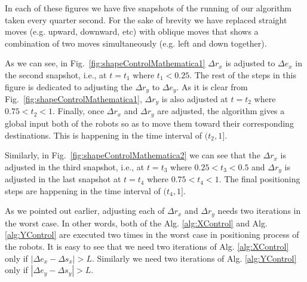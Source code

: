 In each of these figures we have five snapshots of the running of our algorithm taken every quarter second. For the sake of brevity we have replaced straight moves (e.g. upward, downward, etc) with oblique moves that shows a combination of two moves simultaneously (e.g. left and down together). 

As we can see, in Fig.~\ref{fig:shapeControlMathematica1} $\Delta r_x$ is adjusted to $\Delta e_x$ in the second snapshot, i.e., at $t = t_1$ where $t_1<0.25$. The rest of the steps in this figure is dedicated to adjusting the $\Delta r_y$ to $\Delta e_y$. As it is clear from Fig.~\ref{fig:shapeControlMathematica1}, $\Delta r_y$ is also adjusted at $t = t_2$ where $0.75<t_2<1$. Finally, once $\Delta r_x$ and $\Delta r_y$ are adjusted, the algorithm gives a global input both of the robots so as to move them toward their corresponding destinations. This is happening in the time interval of $(t_2,1]$.

Similarly, in Fig.~\ref{fig:shapeControlMathematica2} we can see that the $\Delta r_x$ is adjusted in the third snapshot, i.e., at $t=t_3$ where $0.25<t_3<0.5$ and $\Delta r_y$ is adjusted in the last snapshot at $t=t_4$ where $0.75<t_4<1$. The final positioning steps are happening in the time interval of $(t_4,1]$.

As we pointed out earlier, adjusting each of $\Delta r_x$ and $\Delta r_y$ needs two iterations in the worst case. In other words, both of the Alg. \ref{alg:XControl} and Alg. \ref{alg:YControl} are executed two times in the worst case in positioning process of the robots. It is easy to see that we need two iterations of Alg. \ref{alg:XControl} only if $|\Delta e_x - \Delta s_x|>L$. Similarly we need two iterations of Alg. \ref{alg:YControl} only if $|\Delta e_y - \Delta s_y|>L$.








